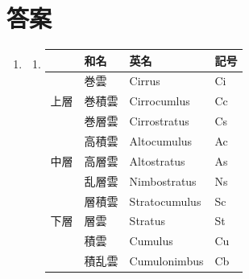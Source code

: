 \documentclass{jsarticle}
\newenvironment{problems}
{
  \renewcommand\labelenumi{\doublebox{\arabic{enumi}}}
  \begin{enumerate}
}{
  \end{enumerate}
  \renewcommand\labelenumi{\arabic{enumi}.}
}
\begin{document}
\section{答案}
\begin{problems}
\item
	\begin{enumerate}[(1)]
  \item 
  \begin{table}[H]
\begin{tabular}{|l|l|l|l|}
\hline
   & 和名  & 英名            & 記号 \\ \hline
   & 巻雲  & Cirrus        & Ci \\ \cline{2-4} 
上層 & 巻積雲 & Cirrocumlus   & Cc \\ \cline{2-4} 
   & 巻層雲 & Cirrostratus  & Cs \\ \hline
   & 高積雲 & Altocumulus   & Ac \\ \cline{2-4} 
中層 & 高層雲 & Altostratus   & As \\ \cline{2-4} 
   & 乱層雲 & Nimbostratus  & Ns \\ \hline
   & 層積雲 & Stratocumulus & Sc \\ \cline{2-4} 
下層 & 層雲  & Stratus       & St \\ \cline{2-4} 
   & 積雲  & Cumulus       & Cu \\ \cline{2-4} 
   & 積乱雲 & Cumulonimbus  & Cb \\ \hline
\end{tabular}
\end{table}


\end{enumerate}
\end{problems}
\end{document}
